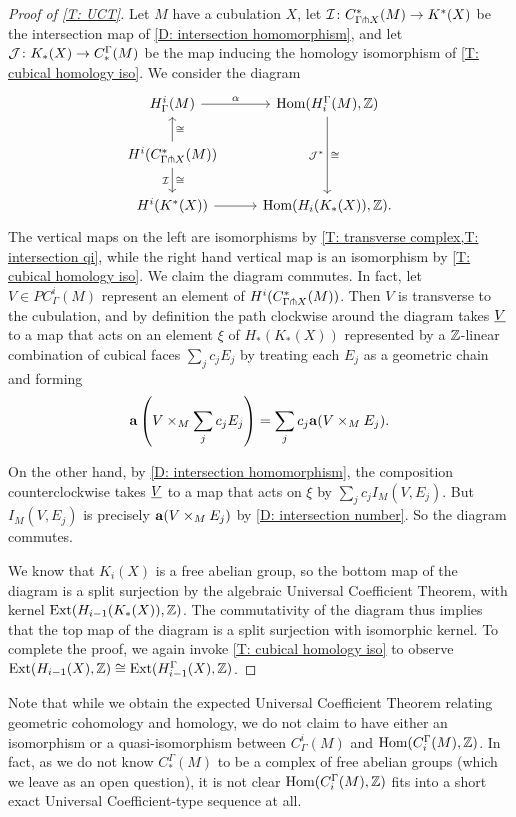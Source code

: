 \begin{proof}[Proof of \cref{T: UCT}]
	Let $M$ have a cubulation $X$, let $\mathcal{I} \colon C_{\Gamma \pitchfork X}^*(M) \to K^*(X)$ be the intersection map of \cref{D: intersection homomorphism},
	and let $\mathcal{J} \colon K_*(X) \to C^\Gamma_*(M)$ be the map inducing the homology isomorphism of \cref{T: cubical homology iso}.
	We consider the diagram
	\[
	\begin{tikzcd}
		H^i_\Gamma(M) \arrow[r, "\alpha"] & \Hom(H_i^\Gamma(M),\Z) \arrow[dd, "\cong", "\mc J^*"'] \\
		H^i(C^*_{\Gamma \pf X}(M)) \arrow[u, "\cong"'] \arrow[d, "\cong", "\mc I"'] & \\
		H^i(K^*(X)) \arrow[r] & \Hom(H_i(K_*(X)), \Z).
	\end{tikzcd}
	\]
	The vertical maps on the left are isomorphisms by \cref{T: transverse complex,T: intersection qi}, while the right hand vertical map is an isomorphism by \cref{T: cubical homology iso}.
	We claim the diagram commutes.
	In fact, let $V \in PC_\Gamma^i(M)$ represent an element of $H^i(C^*_{\Gamma \pitchfork X}(M))$.
	Then $V$ is transverse to the cubulation, and by definition the path clockwise around the diagram takes $\underline{V}$ to a map that acts on an element $\xi$ of $H_*(K_*(X))$ represented by a $\mathbb{Z}$-linear combination of cubical faces $\sum_j c_j E_j$ by treating each $E_j$ as a geometric chain and forming
	$$\mathbf{a}\left( V \times_M \sum_jc_jE_j\right) = \sum_jc_j\mathbf{a}(V \times_M E_j).$$

	On the other hand, by \cref{D: intersection homomorphism}, the composition counterclockwise takes $\underline{V}$ to a map that acts on $\xi$ by $\sum_j c_j I_M(V,E_j)$.
	But $I_M(V,E_j)$ is precisely $\mathbf{a}(V \times_M E_j)$ by \cref{D: intersection number}.
	So the diagram commutes.

	We know that $K_i(X)$ is a free abelian group, so the bottom map of the diagram is a split surjection by the algebraic Universal Coefficient Theorem, with kernel $\textup{Ext}(H_{i-1}(K_*(X)),\mathbb{Z})$.
	The commutativity of the diagram thus implies that the top map of the diagram is a split surjection with isomorphic kernel.
	To complete the proof, we again invoke \cref{T: cubical homology iso} to observe $\textup{Ext}(H_{i-1}(X),\mathbb{Z}) \cong \textup{Ext}(H^\Gamma_{i-1}(X),\mathbb{Z})$.
\end{proof}

\begin{remark}
	Note that while we obtain the expected Universal Coefficient Theorem relating geometric cohomology and homology, we do not claim to have either an isomorphism or a quasi-isomorphism between $C^i_\Gamma(M)$ and $\textup{Hom}(C_i^\Gamma(M),\mathbb{Z})$.
	In fact, as we do not know $C_*^\Gamma(M)$ to be a complex of free abelian groups (which we leave as an open question), it is not clear $\textup{Hom}(C_i^\Gamma(M),\mathbb{Z})$ fits into a short exact Universal Coefficient-type sequence at all.
\end{remark}



